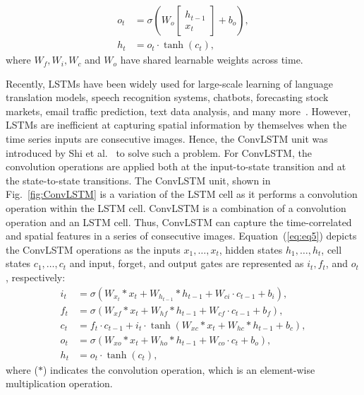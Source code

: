 \begin{sloppypar}
	\begin{equation}
		\begin{aligned}
			o_{t} &=\sigma\left(W_{o} 
			\left[
			\begin{array}{c}
				h_{t-1} \\ x_{t}
			\end{array} 
			\right]
			+b_{o}\right), \\
			h_{t} &=o_{t} \cdot \tanh \left(c_{t}\right),
		\end{aligned}
		\label{eq:eq4}
	\end{equation} 
	where \(W_{f}, W_{i}, W_{c}\) and \(W_{o}\) have shared learnable weights across time.
	
	Recently, LSTMs have been widely used for large-scale learning of language 
	translation models, speech recognition systems, chatbots, forecasting stock 
	markets, email traffic prediction, text data analysis, and many 
	more~\cite{graves2014towards, cho2014properties, om2020modelling}. 
	However, LSTMs are inefficient at capturing spatial information by themselves when the time series inputs are consecutive images.
	Hence, the ConvLSTM unit was introduced by Shi et al.~\cite{xingjian2015convolutional} to solve such a problem.
	For ConvLSTM, the convolution operations are applied both at the input-to-state transition and at the state-to-state transitions.  
	The ConvLSTM unit, shown in Fig.~\ref{fig:ConvLSTM} is a variation of the LSTM cell as it performs a convolution operation within the LSTM cell.
	ConvLSTM is a combination of a convolution operation and an LSTM cell.
	Thus, ConvLSTM can capture the time-correlated and spatial features in a series of consecutive images.
	Equation~(\ref{eq:eq5}) depicts the ConvLSTM operations as the inputs \(x_1, \dots, x_t\), hidden states \(h_1, \dots, h_t\), cell states \(c_1, \dots, c_t\) and input, forget, and output gates are represented as \(i_t, f_t\), and \(o_t\), respectively:
	\begin{equation}
		\begin{aligned}
			i_{t} &=\sigma\left(W_{x_t} * x_{t}+W_{h_{t-1}} * h_{t-1}+W_{c i} \cdot c_{t-1}+b_{i}\right),
			\\
			f_{t} &=\sigma\left(W_{x f} * x_{t}+W_{h f} * h_{t-1}+W_{c f} \cdot c_{t-1}+b_{f}\right), \\
			c_{t} &=f_{t} \cdot c_{t-1}+i_{t} \cdot \tanh \left(W_{x c} * x_{t}+W_{h c} * h_{t-1}+b_{c}\right), 
			\\
			o_{t} &=\sigma\left(W_{x o} * x_{t}+W_{h o} * h_{t-1}+W_{c o} \cdot c_{t}+b_{o}\right), \\
			h_{t} &=o_{t} \cdot \tanh \left(c_{t}\right),
		\end{aligned}
		\label{eq:eq5}
	\end{equation}
	where (\(*\)) indicates the convolution operation, which is an element-wise multiplication operation.
	

\end{sloppypar}
